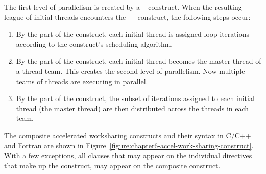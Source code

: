 The first level of parallelism is created by a ~ construct.  When
the resulting league of initial threads encounters
the ~~ construct, the following steps occur:
\begin{enumerate}

\item By the  part of the construct, each initial thread is
assigned loop iterations according to the  construct's
scheduling algorithm.

\item By the  part of the construct, each initial thread becomes
the master thread of a thread team.  This creates the second level of
parallelism. Now multiple teams of threads are
executing in parallel.

\item By the  part of the construct, the subset of iterations
assigned to each initial thread (the master thread) are then distributed across
the threads in each team.

\end{enumerate}

The composite accelerated worksharing constructs and their syntax in C/C++ and
Fortran are shown in Figure~\ref{figure:chapter6-accel-work-sharing-construct}.
With a few exceptions, all clauses that may appear on the individual directives
that make up the construct, may appear on the composite construct.

